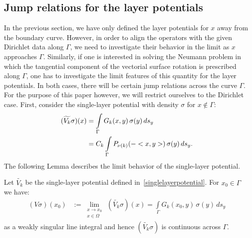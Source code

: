 \subsection{Jump relations for the layer potentials} 
In the previous section, we have only defined the layer potentials for
$x$ away from the boundary curve. However, in order to align the
operators with the given Dirichlet data along $\Gamma$, we need to
investigate their behavior in the limit as $x$ approaches $\Gamma$.
Similarly, if one is interested in solving the Neumann problem in which
the tangential component of the vectorial surface rotation is prescribed
along $\Gamma$, one has to investigate the limit features of this
quantity for the layer potentials. In both cases, there will be certain
jump relations across the curve $\Gamma$. For the purpose of this paper
however, we will restrict ourselves to the Dirichlet case.  First,
consider the single-layer potential with density $\sigma$ for $x \notin
\Gamma$:
\begin{align*}
  (\widetilde{V_k}\sigma)(x) & =  \int\limits_\Gamma
  G_k(x,y)\,\sigma(y)\,ds_{y} \\
  & = C_k \int\limits_\Gamma P_{\nu(k)}(-<x,y>)\,\sigma(y)\,ds_{y}.
\end{align*}
The following Lemma describes the limit behavior of the single-layer
potential.  \begin{lemma} Let $\widetilde{V_k}$ be the single-layer
potential defined in~\eqref{singlelayerpotential}. For $x_{0}\in\Gamma$
we have:
\begin{align*} 
  (V\sigma)(x_0) & := \lim\limits_{\substack{
      x \to x_{0} \\ x \in \Omega}}
  \,(\widetilde{V_k}\sigma)(x) = \int\limits_\Gamma G_k(x_{0},y)\,\sigma(y)\,ds_{y}
\end{align*}
as a weakly singular line integral and hence $(\widetilde{V_k}\sigma)$
is continuous across $\Gamma$.
\end{lemma}
